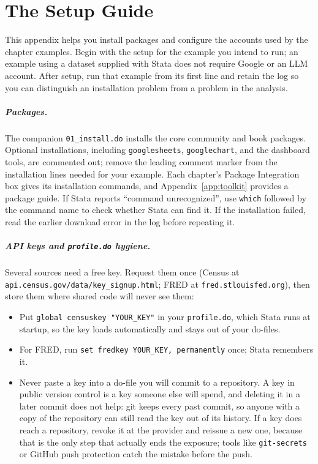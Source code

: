 

\appendix
{}

\chapter{The Setup Guide}\label{app:setup}
This appendix helps you install packages and configure the accounts used by the chapter examples. Begin with the setup for the example you intend to run; an example using a dataset supplied with Stata does not require Google or an LLM account. After setup, run that example from its first line and retain the log so you can distinguish an installation problem from a problem in the analysis.

\paragraph{Packages.} The companion \texttt{01\_install.do} installs the core community and book packages. Optional installations, including \texttt{googlesheets}, \texttt{googlechart}, and the dashboard tools, are commented out; remove the leading comment marker from the installation lines needed for your example. Each chapter's Package Integration box gives its installation commands, and Appendix~\ref{app:toolkit} provides a package guide. If Stata reports \enquote{command unrecognized}, use \texttt{which} followed by the command name to check whether Stata can find it. If the installation failed, read the earlier download error in the log before repeating it.

\paragraph{API keys and \texttt{profile.do} hygiene.} Several sources need a free key. Request them once (Census at \texttt{api.census.gov/data/key\_signup.html}; FRED at \texttt{fred.stlouisfed.org}), then store them where shared code will never see them:
\begin{itemize}
    \item Put \texttt{global censuskey "YOUR\_KEY"} in your \texttt{profile.do}, which Stata runs at startup, so the key loads automatically and stays out of your do-files.
    \item For FRED, run \texttt{set fredkey YOUR\_KEY, permanently} once; Stata remembers it.
    \item Never paste a key into a do-file you will commit to a repository. A key in public version control is a key someone else will spend, and deleting it in a later commit does not help: git keeps every past commit, so anyone with a copy of the repository can still read the key out of its history. If a key does reach a repository, revoke it at the provider and reissue a new one, because that is the only step that actually ends the exposure; tools like \texttt{git-secrets} or GitHub push protection catch the mistake before the push.
\end{itemize}

